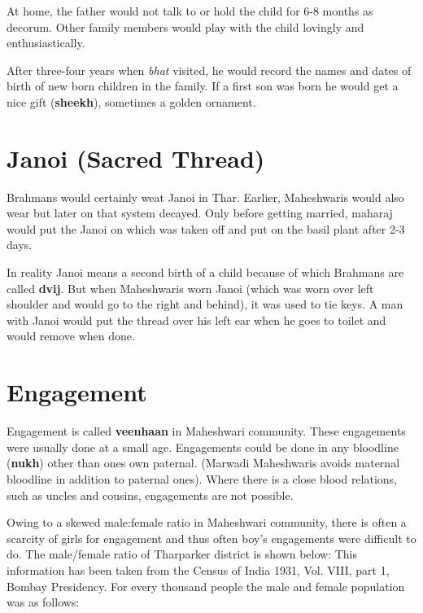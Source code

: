 At home, the father would not talk to or hold the child for 6-8 months as
decorum. Other family members would play with the child lovingly and
enthusiastically.

After three-four years when \textit{bhat} visited, he would record the names
and dates of birth of new born children in the family. If a first son was born
he would get a nice gift (\textbf{sheekh}), sometimes a golden ornament.

\section{Janoi (Sacred Thread)}
Brahmans would certainly weat Janoi in Thar. Earlier, Maheshwaris would also
wear but later on that system decayed. Only before getting married, maharaj
would put the Janoi on which was taken off and put on the basil plant after 2-3
days.

In reality Janoi means a second birth of a child because of which Brahmans are
called \textbf{dvij}. But when Maheshwaris worn Janoi (which was worn over left
shoulder and would go to the right and behind), it was used to tie keys. A man
with Janoi would put the thread over his left ear when he goes to toilet and
would remove when done.

\section{Engagement}
Engagement is called \textbf{veenhaan} in Maheshwari community. These
engagements were usually done at a small age. Engagements could be done in any
bloodline (\textbf{nukh}) other than ones own paternal. (Marwadi Maheshwaris
avoids maternal bloodline in addition to paternal ones). Where there is a close
blood relations, such as uncles and cousins, engagements are not possible.

Owing to a skewed male:female ratio in Maheshwari community, there is often a
scarcity of girls for engagement and thus often boy's engagements were
difficult to do.
The male/female ratio of Tharparker district is shown below: This information
has been taken from the Census of India 1931, Vol. VIII, part 1, Bombay
Presidency. For every thousand people the male and female population was as
follows:

